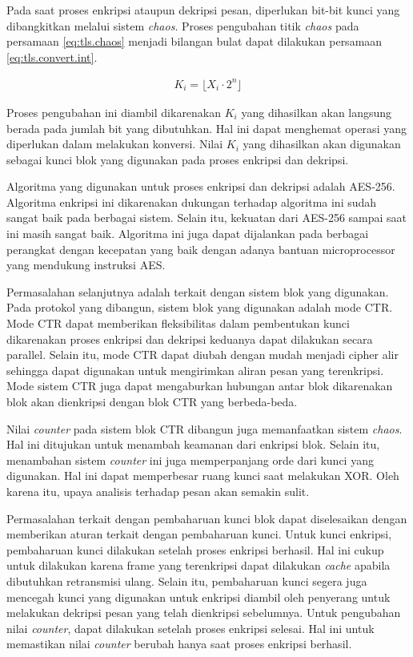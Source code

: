 Pada saat proses enkripsi ataupun dekripsi pesan, diperlukan bit-bit kunci yang dibangkitkan melalui sistem \emph{chaos}. Proses pengubahan titik \emph{chaos} pada persamaan \ref{eq:tls.chaos} menjadi bilangan bulat dapat dilakukan persamaan \ref{eq:tls.convert.int}.

\begin{equation}
  \begin{aligned}
    K_i = \lfloor{X_i \cdot 2^{n}}\rfloor
  \end{aligned}
  \label{eq:tls.convert.int}
\end{equation}

Proses pengubahan ini diambil dikarenakan $K_i$ yang dihasilkan akan langsung berada pada jumlah bit yang dibutuhkan. Hal ini dapat menghemat operasi yang diperlukan dalam melakukan konversi. Nilai $K_i$ yang dihasilkan akan digunakan sebagai kunci blok yang digunakan pada proses enkripsi dan dekripsi.

Algoritma yang digunakan untuk proses enkripsi dan dekripsi adalah AES-256. Algoritma enkripsi ini dikarenakan dukungan terhadap algoritma ini sudah sangat baik pada berbagai sistem. Selain itu, kekuatan dari AES-256 sampai saat ini masih sangat baik. Algoritma ini juga dapat dijalankan pada berbagai perangkat dengan kecepatan yang baik dengan adanya bantuan microprocessor yang mendukung instruksi AES.

Permasalahan selanjutnya adalah terkait dengan sistem blok yang digunakan. Pada protokol yang dibangun, sistem blok yang digunakan adalah mode CTR. Mode CTR dapat memberikan fleksibilitas dalam pembentukan kunci dikarenakan proses enkripsi dan dekripsi keduanya dapat dilakukan secara parallel. Selain itu, mode CTR dapat diubah dengan mudah menjadi cipher alir sehingga dapat digunakan untuk mengirimkan aliran pesan yang terenkripsi. Mode sistem CTR juga dapat mengaburkan hubungan antar blok dikarenakan blok akan dienkripsi dengan blok CTR yang berbeda-beda.

Nilai \emph{counter} pada sistem blok CTR dibangun juga memanfaatkan sistem \emph{chaos}. Hal ini ditujukan untuk menambah keamanan dari enkripsi blok. Selain itu, menambahan sistem \emph{counter} ini juga memperpanjang orde dari kunci yang digunakan. Hal ini dapat memperbesar ruang kunci saat melakukan XOR. Oleh karena itu, upaya analisis terhadap pesan akan semakin sulit.

Permasalahan terkait dengan pembaharuan kunci blok dapat diselesaikan dengan memberikan aturan terkait dengan pembaharuan kunci. Untuk kunci enkripsi, pembaharuan kunci dilakukan setelah proses enkripsi berhasil. Hal ini cukup untuk dilakukan karena frame yang terenkripsi dapat dilakukan \emph{cache} apabila dibutuhkan retransmisi ulang. Selain itu, pembaharuan kunci segera juga mencegah kunci yang digunakan untuk enkripsi diambil oleh penyerang untuk melakukan dekripsi pesan yang telah dienkripsi sebelumnya. Untuk pengubahan nilai \emph{counter}, dapat dilakukan setelah proses enkripsi selesai. Hal ini untuk memastikan nilai \emph{counter} berubah hanya saat proses enkripsi berhasil. 

